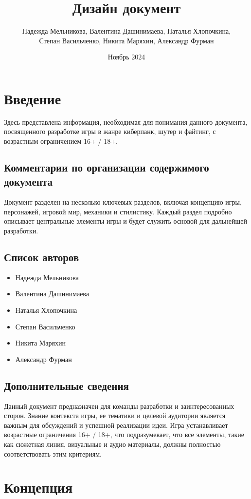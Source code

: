 \documentclass{article}
\title{Дизайн документ}
\author{Надежда Мельникова, Валентина Дашинимаева, Наталья Хлопочкина, \\
Степан Васильченко, Никита Маряхин, Александр Фурман}
\date{Ноябрь 2024}
\begin{document}
\maketitle
\renewcommand{\contentsname}{Оглавление}
\tableofcontents

\section{Введение}

Здесь представлена информация, необходимая для понимания данного документа, посвященного разработке игры в жанре киберпанк, шутер и файтинг, с возрастным ограничением 16+ / 18+.

\subsection{Комментарии по организации содержимого документа}
Документ разделен на несколько ключевых разделов, включая концепцию игры, персонажей, игровой мир, механики и стилистику. Каждый раздел подробно описывает центральные элементы игры и будет служить основой для дальнейшей разработки.


\subsection{Список авторов}
\begin{itemize}
    \item Надежда Мельникова 
    \item Валентина Дашинимаева 
    \item Наталья Хлопочкина
    \item Степан Васильченко 
    \item Никита Маряхин 
    \item Александр Фурман 
\end{itemize}


\subsection{Дополнительные сведения}
Данный документ предназначен для команды разработки и заинтересованных сторон. Знание контекста игры, ее тематики и целевой аудитории является важным для обсуждений и успешной реализации идеи. Игра устанавливает возрастные ограничения 16+ / 18+, что подразумевает, что все элементы, такие как сюжетная линия, визуальные и аудио материалы, должны полностью соответствовать этим критериям.

\section{Концепция}
\end{document}
